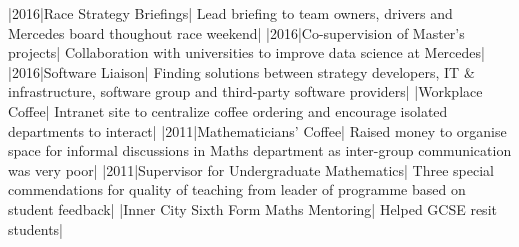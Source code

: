\documentclass[a4paper,10pt]{article}
\begin{document}

\begin{cvsection}[Communication]
  |2016|Race Strategy Briefings| Lead briefing to team owners, drivers
  and Mercedes board thoughout race weekend|
  |2016|Co-supervision of Master's projects| Collaboration with
  universities to improve data science at Mercedes|
  |2016|Software Liaison| Finding solutions between strategy developers,
  IT \& infrastructure, software group and third-party software providers|
  |Workplace Coffee| Intranet site to centralize coffee ordering and
  encourage isolated departments to interact|
  |2011|Mathematicians' Coffee| Raised money to organise space for informal discussions in
  Maths department as inter-group communication was very poor| 
  |2011|Supervisor for Undergraduate Mathematics| Three special
  commendations for quality of teaching from leader of programme based on
  student feedback|
  |Inner City Sixth Form Maths Mentoring| Helped GCSE resit students|
\end{cvsection}
\end{document}
